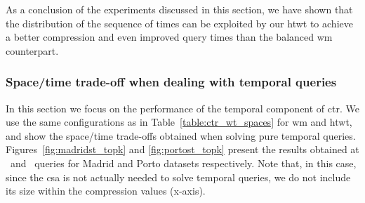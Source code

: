 

	As a conclusion of the experiments discussed in this section, we have shown that
	the distribution of the sequence of times can be
	exploited by our \gls{htwt} to achieve a better compression and even improved
	query times than the balanced \gls{wm} counterpart.


	\subsubsection{Space/time trade-off when dealing with temporal  queries}

	In this section we focus on the performance of the temporal component of \gls{ctr}. We use the same 
	configurations as in Table~\ref{table:ctr_wt_spaces} for \gls{wm} and \gls{htwt}, and 
	show the space/time trade-offs obtained when solving pure temporal queries. Figures~\ref{fig:madridst_topk}
	and \ref{fig:portost_topk} present the results obtained at  \loadT\ and \startT\ queries for Madrid and Porto datasets respectively. 
	Note that, in this case, since the \gls{csa} is not actually needed to solve temporal queries, we do not include its size
	within the compression values (x-axis). 



